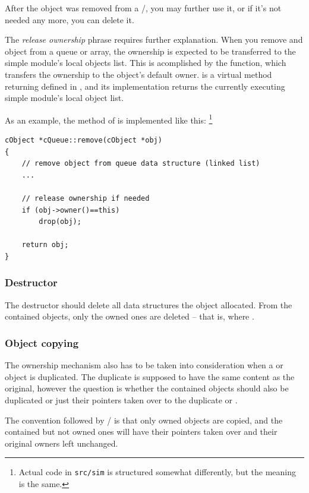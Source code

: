 After the object was removed from a /,
you may further use it, or if it's not needed any more, you can delete it.

The \textit{release ownership} phrase requires further explanation.
When you remove and object from a queue or array, the ownership
is expected to be transferred to the simple module's local objects list.
This is acomplished by the  function, which transfers the
ownership to the object's default owner.
 is a virtual method returning 
defined in , and its implementation returns
the currently executing simple module's local object list.

As an example, the  method of  is
implemented like this:
  \footnote{Actual code in \texttt{src/sim} is structured somewhat
  differently, but the meaning is the same.}

\begin{verbatim}
cObject *cQueue::remove(cObject *obj)
{
    // remove object from queue data structure (linked list)
    ...

    // release ownership if needed
    if (obj->owner()==this)
        drop(obj);

    return obj;
}
\end{verbatim}


\subsubsection{Destructor}

The destructor should delete all data structures the object allocated.
From the contained objects, only the owned ones are deleted -- that is,
where .


\subsubsection{Object copying}

The ownership mechanism also has to be taken into consideration
when a  or  object is duplicated.
The duplicate is supposed to have the same content as the
original, however the question is whether the contained objects
should also be duplicated or just their pointers taken over
to the duplicate  or .

The convention followed by / is that
only owned objects are copied, and the contained but not owned ones
will have their pointers taken over and their original owners
left unchanged.

